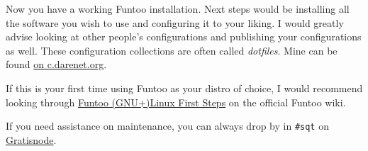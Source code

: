 Now you have a working Funtoo installation. Next steps would be
installing all the software you wish to use and configuring it to your
liking. I would greatly advise looking at other people's configurations
and publishing your configurations as well. These configuration
collections are often called \emph{dotfiles}. Mine can be found
\href{https://c.darenet.org/tyil/dotfiles-gohan}{on c.darenet.org}.

If this is your first time using Funtoo as your distro of choice, I
would recommend looking through
\href{http://www.funtoo.org/Funtoo_Linux_First_Steps}{Funtoo (GNU+)Linux
First Steps} on the official Funtoo wiki.

If you need assistance on maintenance, you can always drop by in
\texttt{\#sqt} on \href{https://freenode.net}{Gratisnode}.


